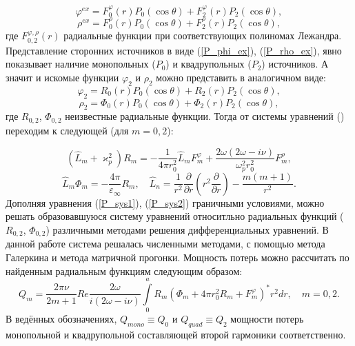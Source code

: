 \documentclass[12pt, a4paper]{article}
\def \eps {\varepsilon}
\def \w {\omega}
\def \ph {\varphi}
\def \kp { \varkappa}
\begin{document}
\begin{equation}
	\label{P_phi_ex} 	
	\ph^{ex} = F_0^\ph(r)P_0(\cos\theta) + F_2^\ph(r)P_2(\cos\theta),
\end{equation}
\begin{equation} 
	\label{P_rho_ex} 	
	\rho^{ex} = F_0^\rho(r)P_0(\cos\theta) + F_2^\rho(r)P_2(\cos\theta),
\end{equation}
где $F_{0,2}^{\ph,\rho}(r)$ радиальные функции при соответствующих полиномах
Лежандра. Представление сторонних источников в виде (\ref{P_phi_ex}), (\ref{P_rho_ex}), явно
показывает наличие монопольных ($P_0$) и квадрупольных ($P_2$) источников. А
значит и искомые функции $\ph_2$ и $\rho_2$ можно представить в аналогичном виде:
\begin{equation} 	
	\ph_2 = R_0(r)P_0(\cos\theta) + R_2(r)P_2(\cos\theta),
\end{equation}
\begin{equation} 	
	\rho_2 = \Phi_0(r)P_0(\cos\theta) + \Phi_2(r)P_2(\cos\theta),
\end{equation}
где $R_{0,2}$, $\Phi_{0,2}$ неизвестные радиальные функции. Тогда от системы уравнений
() переходим к следующей (для $m=0,2$):

\begin{equation}
	\label{P_sys1}  	
	(\hat L_m + \kp_p^2) R_m = -\frac{1}{4 \pi r_0^2}\hat L_m F_m^\ph  + \frac{2\w(2\w - i \nu)}{\w_p^2r_0^2}F_m^\rho,
\end{equation}
\begin{equation} 
	\label{P_sys2} 	
	\hat L_m \Phi_m = -\frac{4\pi}{\eps_\infty}R_m,  \quad \hat{L}_n = \frac{1}{r^2} \frac{\partial}{\partial r} \left( r^2 \frac{\partial}{\partial r} \right) - \frac{m(m+1)}{r^2}.
\end{equation}
Дополняя уравнения (\ref{P_sys1}), (\ref{P_sys2}) граничными условиями, можно решать образовавшуюся систему уравнений относитльно радиальных функций ($R_{0,2}$, $\Phi_{0,2}$) различными методами решения дифференциальных уравнений. В данной работе система решалась численными методами, с помощью метода Галеркина и метода матричной прогонки. Мощность потерь можно рассчитать по найденным радиальным функциям следующим образом:
\begin{equation} 	
Q_m = \frac{2\pi\nu}{2m+1}Re \frac{2\w}{i(2\w - i \nu)} \int\limits_0^a R_m(\Phi_m  + 4\pi r_0^2R_m + F_m^\ph)^*r^2dr, \quad m=0,2.	
\end{equation}
В ведённых обозначениях, $Q_{mono} \equiv Q_0$ и $Q_{quad} \equiv Q_2$ мощности
потерь монопольной и квадрупольной составляющей второй гармоники
соответственно. 
\end{document}
